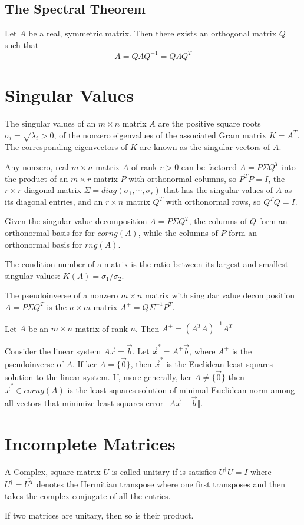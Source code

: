     \subsection{The Spectral Theorem}
    Let $A$ be a real, symmetric matrix. Then there exists an orthogonal matrix $Q$ such that
        \[ A = Q \Lambda Q^{-1} = Q \Lambda Q^T \]

\section{Singular Values}
The singular values of an $m \times n$ matrix $A$ are the positive square roots $\sigma_i = \sqrt{\lambda_i} > 0$, of the nonzero eigenvalues of the associated Gram matrix $K = A^T $. The corresponding eigenvectors of $K$ are known as the singular vectors of $A$.

Any nonzero, real $m \times n$ matrix $A$ of rank $r > 0$ can be factored $ A = P \Sigma Q^T $ into the product of an $m \times r$ matrix $P$ with orthonormal columns, so $P^T P = I$, the $r \times r$ diagonal matrix $\Sigma = diag(\sigma_1, \cdots, \sigma_r)$ that has the singular values of $A$ as its diagonal entries, and an $r \times n$ matrix $Q^T$ with orthonormal rows, so $Q^T Q = I$.

Given the singular value decomposition $A = P \Sigma Q^T$, the columns of $Q$ form an orthonormal basis for for $corng(A)$, while the columns of $P$ form an orthonormal basis for $rng(A)$.

The condition number of a matrix is the ratio between its largest and smallest singular values: $K(A) = \sigma_1 / \sigma_2$.

The pseudoinverse of a nonzero $m \times n$ matrix with singular value decomposition $A = P \Sigma Q^T$ is the $n \times m$ matrix $A^+ = Q \Sigma^{-1} P^T$.

Let $A$ be an $m \times n$ matrix of rank $n$. Then $A^+ = {(A^T A)}^{-1}A^T$

Consider the linear system $A \vec{x} = \vec{b}$. Let $\vec{x}^* = A^+ \vec{b}$, where $A^+$ is the pseudoinverse of $A$. If ker $A = \{ \vec{0} \}$, then $\vec{x}^*$ is the Euclidean least squares solution to the linear system. If, more generally, ker $A \neq \{ \vec{0} \}$ then $\vec{x}^* \in corng(A)$ is the least squares solution of minimal Euclidean norm among all vectors that minimize least squares error $\Vert A \vec{x} - \vec{b} \Vert$.

\section{Incomplete Matrices}
A Complex, square matrix $U$ is called unitary if is satisfies $U^\dagger U = I$ where $U^\dagger = \overline{U^T}$ denotes the Hermitian transpose where one first transposes and then takes the complex conjugate of all the entries.

If two matrices are unitary, then so is their product.
